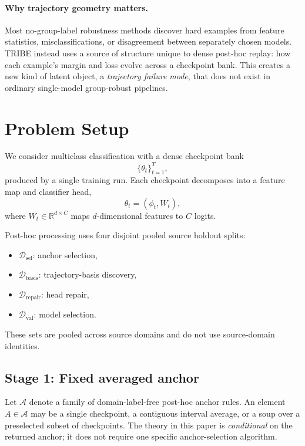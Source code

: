 \documentclass{article}
\newcommand{\RR}{\mathbb{R}}
\newcommand{\cA}{\mathcal{A}}
\newcommand{\cD}{\mathcal{D}}
\newcommand{\tribe}{\textup{\textsc{TRIBE}}}
\newcommand{\1}{\mathbbm{1}}
\begin{document}
\paragraph{Why trajectory geometry matters.}
Most no-group-label robustness methods discover hard examples from feature statistics, misclassifications, or disagreement between separately chosen models. \tribe{} instead uses a source of structure unique to dense post-hoc replay: how each example's margin and loss evolve across a checkpoint bank. This creates a new kind of latent object, a \emph{trajectory failure mode}, that does not exist in ordinary single-model group-robust pipelines.

\section{Problem Setup}
\label{sec:setup}

We consider multiclass classification with a dense checkpoint bank
\[
    \{\theta_t\}_{t=1}^{T},
\]
produced by a single training run. Each checkpoint decomposes into a feature map and classifier head,
\[
    \theta_t = (\phi_t, W_t),
\]
where \(W_t \in \RR^{d\times C}\) maps \(d\)-dimensional features to \(C\) logits.

Post-hoc processing uses four disjoint pooled source holdout splits:
\begin{itemize}[leftmargin=1.4em]
    \item \(\cD_{\mathrm{sel}}\): anchor selection,
    \item \(\cD_{\mathrm{basis}}\): trajectory-basis discovery,
    \item \(\cD_{\mathrm{repair}}\): head repair,
    \item \(\cD_{\mathrm{val}}\): model selection.
\end{itemize}
These sets are pooled across source domains and do not use source-domain identities.

\subsection{Stage 1: Fixed averaged anchor}

Let \(\cA\) denote a family of domain-label-free post-hoc anchor rules. An element \(A\in\cA\) may be a single checkpoint, a contiguous interval average, or a soup over a preselected subset of checkpoints. The theory in this paper is \emph{conditional} on the returned anchor; it does not require one specific anchor-selection algorithm.
\end{document}
